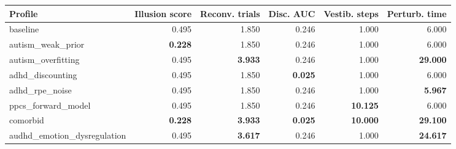 \begin{tabular}{lrrrrr}
\toprule
Profile & Illusion score & Reconv. trials & Disc. AUC & Vestib. steps & Perturb. time \\
\midrule
baseline & 0.495 & 1.850 & 0.246 & 1.000 & 6.000 \\
\midrule
autism\_weak\_prior & \textbf{0.228} & 1.850 & 0.246 & 1.000 & 6.000 \\
autism\_overfitting & 0.495 & \textbf{3.933} & 0.246 & 1.000 & \textbf{29.000} \\
adhd\_discounting & 0.495 & 1.850 & \textbf{0.025} & 1.000 & 6.000 \\
adhd\_rpe\_noise & 0.495 & 1.850 & 0.246 & 1.000 & \textbf{5.967} \\
ppcs\_forward\_model & 0.495 & 1.850 & 0.246 & \textbf{10.125} & 6.000 \\
comorbid & \textbf{0.228} & \textbf{3.933} & \textbf{0.025} & \textbf{10.000} & \textbf{29.100} \\
audhd\_emotion\_dysregulation & 0.495 & \textbf{3.617} & 0.246 & 1.000 & \textbf{24.617} \\
\bottomrule
\end{tabular}
